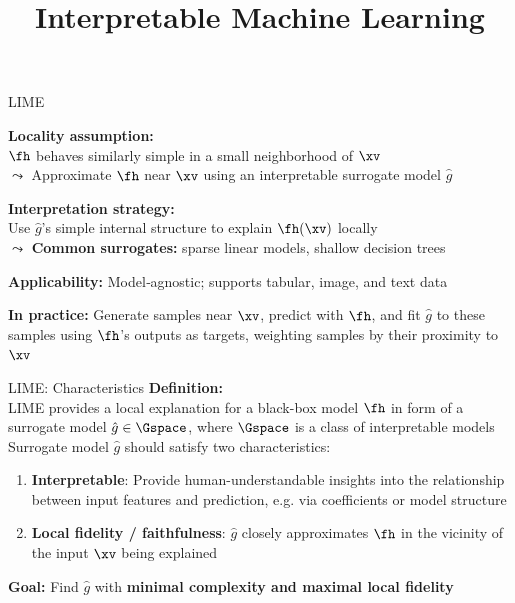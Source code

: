 \documentclass[10pt,compress,t,notes=noshow, xcolor=table]{beamer}
\title{Interpretable Machine Learning}
\newcommand{\gh}{\hat{g}}
\begin{document}







\begin{framei}[align=top]{LIME}
\item \textbf{Locality assumption:}\\
$\fh$ behaves similarly simple in a small neighborhood of $\xv$\\
$\leadsto$ Approximate $\fh$ near $\xv$ using an interpretable surrogate model $\gh$
\item \textbf{Interpretation strategy:}\\
Use $\gh$'s simple internal structure to explain $\fh(\xv)$ locally\\
$\leadsto$ \textbf{Common surrogates:} sparse linear models, shallow decision trees
\item \textbf{Applicability:} Model‑agnostic; supports tabular, image, and text data %
\item \textbf{In practice:}
Generate samples near $\xv$, predict with $\fh$, and fit $\gh$ to these samples using $\fh$'s outputs as targets, weighting samples by their proximity to $\xv$
\end{framei}


\begin{framev}[align=top]{LIME: Characteristics}
\textbf{Definition:}\\
LIME provides a local explanation for a black-box model $\fh$ in form of a surrogate model $\gh \in \Gspace$, where $\Gspace$ is a class of interpretable models\\
\spacer[0.25]
Surrogate model $\gh$ should satisfy two characteristics:
\begin{enumerate}
\item \textbf{Interpretable}: Provide human-understandable insights into the relationship between input features and prediction, e.g. via coefficients or model structure
\item \textbf{Local fidelity / faithfulness}: $\gh$ closely approximates $\fh$ in the vicinity of the input $\xv$ being explained
\end{enumerate}
\textbf{Goal:} Find $\gh$ with \textbf{minimal complexity and maximal local fidelity}
\end{framev}
\end{document}
